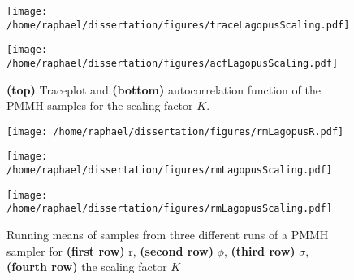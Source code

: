 \documentclass{article}
\begin{document}
	\begin{figure}[htb]
		\centering
		\begin{minipage}{0.9\textwidth}
			\centering
			\texttt{[image: /home/raphael/dissertation/figures/traceLagopusScaling.pdf]}
		\end{minipage}
		\begin{minipage}{0.9\textwidth}
			\centering
			\texttt{[image: /home/raphael/dissertation/figures/acfLagopusScaling.pdf]}
		\end{minipage}
		\caption{\textbf{(top)} Traceplot and \textbf{(bottom)} autocorrelation function of the PMMH samples for the scaling factor $K$.}
		\label{fig:lagopusScaling}
	\end{figure}
	
	\begin{figure}[htb]
		\centering
		\begin{minipage}{0.9\textwidth}
			\centering
			\texttt{[image: /home/raphael/dissertation/figures/rmLagopusR.pdf]}
		\end{minipage}
		\begin{minipage}{0.9\textwidth}
			\centering
			\texttt{[image: /home/raphael/dissertation/figures/rmLagopusScaling.pdf]}
		\end{minipage}
		\begin{minipage}{0.9\textwidth}
			\centering
			\texttt{[image: /home/raphael/dissertation/figures/rmLagopusScaling.pdf]}
		\end{minipage}
		\caption{Running means of samples from three different runs of a PMMH sampler for \textbf{(first row)} r, \textbf{(second row)} $\phi$, \textbf{(third row)} $\sigma$, \textbf{(fourth row)} the scaling factor $K$}
		\label{fig:rmLagopus}
	\end{figure}
\end{document}
